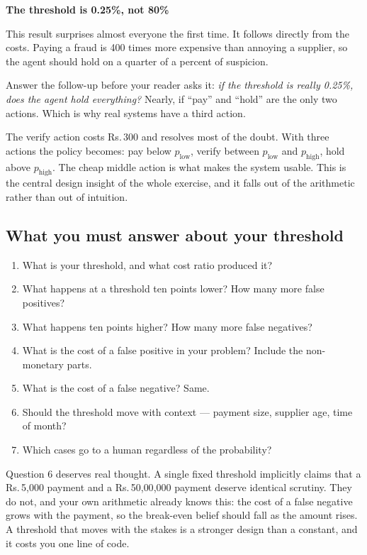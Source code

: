 \documentclass[11pt,a4paper]{article}
\newcommand{\rs}{Rs.\,}
\newcommand{\boxtitle}[1]{{\bfseries #1}\par\vspace{2pt}}
\begin{document}
\begin{sbbox}
\boxtitle{The threshold is 0.25\%, not 80\%}
This result surprises almost everyone the first time. It follows directly from the costs. Paying
a fraud is 400 times more expensive than annoying a supplier, so the agent should hold on a
quarter of a percent of suspicion.

Answer the follow-up before your reader asks it: \emph{if the threshold is really 0.25\%, does the
agent hold everything?} Nearly, if ``pay'' and ``hold'' are the only two actions. Which is why
real systems have a third action.

The verify action costs \rs 300 and resolves most of the doubt. With three actions the policy
becomes: pay below $p_{\text{low}}$, verify between $p_{\text{low}}$ and $p_{\text{high}}$, hold
above $p_{\text{high}}$. The cheap middle action is what makes the system usable. This is the
central design insight of the whole exercise, and it falls out of the arithmetic rather than out
of intuition.
\end{sbbox}

\subsection{What you must answer about your threshold}

\begin{enumerate}
  \item What is your threshold, and what cost ratio produced it?
  \item What happens at a threshold ten points lower? How many more false positives?
  \item What happens ten points higher? How many more false negatives?
  \item What is the cost of a false positive in your problem? Include the non-monetary parts.
  \item What is the cost of a false negative? Same.
  \item Should the threshold move with context --- payment size, supplier age, time of month?
  \item Which cases go to a human regardless of the probability?
\end{enumerate}

Question 6 deserves real thought. A single fixed threshold implicitly claims that a
\rs 5{,}000 payment and a \rs 50{,}00{,}000 payment deserve identical scrutiny. They do not,
and your own arithmetic already knows this: the cost of a false negative grows with the payment,
so the break-even belief should fall as the amount rises. A threshold that moves with the stakes is a stronger design than a constant,
and it costs you one line of code.
\end{document}
